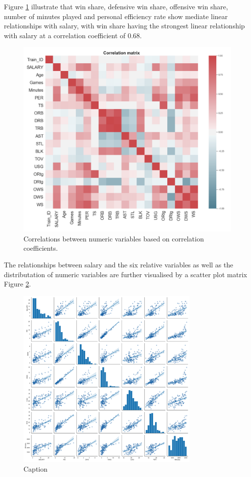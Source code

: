 \documentclass[letterpaper,12pt,twoside,]{pinp}
\begin{document}
Figure \ref{fig:correlation} illustrate that win share, defensive win
share, offensive win share, number of minutes played and personal
efficiency rate show mediate linear relationships with salary, with win
share having the strongest linear relationship with salary at a
correlation coefficient of 0.68.

\begin{figure}[H]
\includegraphics[width=0.8\linewidth]{correlation.png}
\centering
\caption{Correlations between numeric variables based on correlation coefficients.}
\label{fig:correlation}
\end{figure}

The relationships between salary and the six relative variables as well
as the distributation of numeric variables are further visualised by a
scatter plot matrix Figure \ref{fig:scatter}.

\begin{figure}[H]
\includegraphics[width=0.8\textwidth]{scatter.png}
\centering
\caption{Caption}
\label{fig:scatter}
\end{figure}
\end{document}
